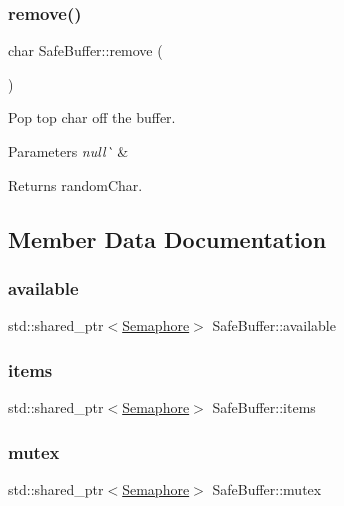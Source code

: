 \subsubsection{\texorpdfstring{remove()}{remove()}}
{\footnotesize\ttfamily char Safe\+Buffer\+::remove (\begin{DoxyParamCaption}{ }\end{DoxyParamCaption})}



Pop top char off the buffer. 


\begin{DoxyParams}{Parameters}
{\em null\`{}} & \\
\hline
\end{DoxyParams}
\begin{DoxyReturn}{Returns}
random\+Char. 
\end{DoxyReturn}


\subsection{Member Data Documentation}
\mbox{\label{class_safe_buffer_a0ad0b633fecd803a5c061635be0f6d31}} 
\subsubsection{\texorpdfstring{available}{available}}
{\footnotesize\ttfamily std\+::shared\+\_\+ptr$<$\mbox{\hyperlink{class_semaphore}{Semaphore}}$>$ Safe\+Buffer\+::available}

\mbox{\label{class_safe_buffer_aab374b9839a583473e1ec8938715a8e7}} 
\subsubsection{\texorpdfstring{items}{items}}
{\footnotesize\ttfamily std\+::shared\+\_\+ptr$<$\mbox{\hyperlink{class_semaphore}{Semaphore}}$>$ Safe\+Buffer\+::items}

\mbox{\label{class_safe_buffer_a7f90950b182359904348ff978ebb96c6}} 
\subsubsection{\texorpdfstring{mutex}{mutex}}
{\footnotesize\ttfamily std\+::shared\+\_\+ptr$<$\mbox{\hyperlink{class_semaphore}{Semaphore}}$>$ Safe\+Buffer\+::mutex}

